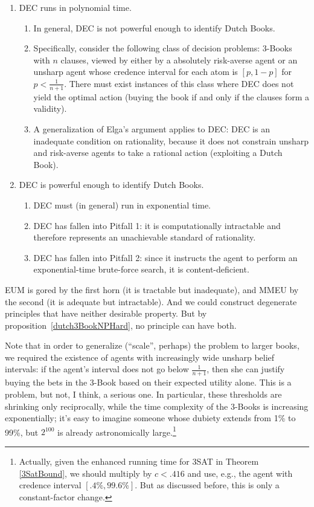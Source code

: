 \documentclass[letterpaper,12pt]{article}
\begin{document}
\begin{enumerate}
\item
DEC runs in polynomial time.
\begin{enumerate}
\item
In general, DEC is not powerful enough to identify Dutch Books.
\item
Specifically, consider the following class of decision problems: 3-Books with $n$ clauses, viewed by either by a absolutely risk-averse agent or an unsharp agent whose credence interval for each atom is $[p, 1-p]$ for $p < \frac{1}{n+1}$. There must exist instances of this class where DEC does not yield the optimal action (buying the book if and only if the clauses form a validity).
\item
A generalization of Elga's argument applies to DEC: DEC is an inadequate condition on rationality, because it does not constrain unsharp and risk-averse agents to take a rational action (exploiting a Dutch Book).
\end{enumerate}
\item
DEC is powerful enough to identify Dutch Books.
\begin{enumerate}
\item
DEC must (in general) run in exponential time.
\item
DEC has fallen into Pitfall 1: it is computationally intractable and therefore represents an unachievable standard of rationality.
\item
DEC has fallen into Pitfall 2: since it instructs the agent to perform an exponential-time brute-force search, it is content-deficient.
\end{enumerate}
\end{enumerate}

EUM is gored by the first horn (it is tractable but inadequate), and MMEU by the second (it is adequate but intractable). And we could construct degenerate principles that have neither desirable property. But by proposition~\ref{dutch3BookNPHard}, no principle can have both.

Note that in order to generalize (``scale'', perhaps) the problem to larger books, we required the existence of agents with increasingly wide unsharp belief intervals: if the agent's interval does not go below $\frac{1}{n+1}$, then she can justify buying the bets in the 3-Book based on their expected utility alone. This is a problem, but not, I think, a serious one. In particular, these thresholds are shrinking only reciprocally, while the time complexity of the 3-Books is increasing exponentially; it's easy to imagine someone whose dubiety extends from 1\% to 99\%, but $2^{100}$ is already astronomically large.\footnote{Actually, given the enhanced running time for 3SAT in Theorem \ref{3SatBound}, we should multiply by $c < .416$ and use, e.g., the agent with credence interval $[.4\%, 99.6\%]$. But as discussed before, this is only a constant-factor change.}
\end{document}
